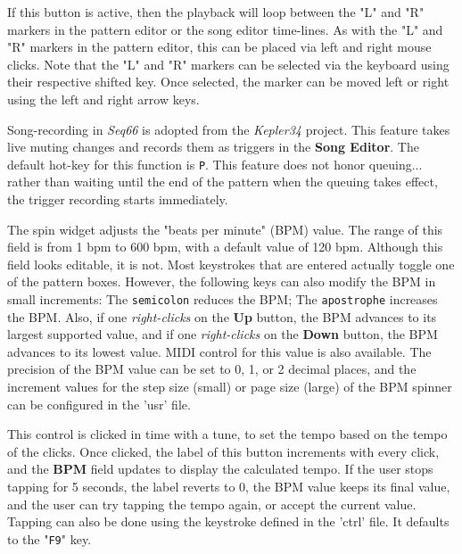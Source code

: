    If this button is active, then the playback will loop
   between the "L" and "R" markers in the pattern editor or the song editor
   time-lines.
   As with the "L" and "R" markers in the pattern editor, this can
   be placed via left and right mouse clicks.
   Note that the "L" and "R" markers can be selected via the keyboard using
   their respective shifted key.  Once selected, the marker can be moved left
   or right using the left and right arrow keys.

   Song-recording in \textsl{Seq66} is adopted from the
   \textsl{Kepler34} project.
   This feature takes live muting changes and records them as
   triggers in the \textbf{Song Editor}.
   The default hot-key for this function is \texttt{P}.
   This feature does not honor queuing...
   rather than waiting until the end of the pattern when the queuing takes
   effect, the trigger recording starts immediately.


   The spin widget adjusts the "beats per minute" (BPM) value.  The
   range of this field is from 1 bpm to 600 bpm, with a default value of
   120 bpm.
   Although this field looks editable, it is not.  Most keystrokes
   that are entered actually toggle one of the pattern boxes.
   However, the following keys can also modify the BPM in small increments:
   The \texttt{semicolon} reduces the BPM;
   The \texttt{apostrophe} increases the BPM.
   Also, if one \textsl{right-clicks} on the
   \textbf{Up} button, the BPM advances to its largest
   supported value, and if one \textsl{right-clicks} on the
   \textbf{Down} button, the BPM
   advances to its lowest value.
   MIDI control for this value is also available.
   The precision of the BPM value can be set to 0, 1, or 2
   decimal places, and the increment values for the step size (small)
   or page size (large) of the BPM spinner can be configured in the 'usr' file.

   This control is clicked in time with a tune, to set the
   tempo based on the tempo of the clicks.  Once clicked, the label of this
   button increments with every click, and the \textbf{BPM} field updates to
   display the calculated tempo.  If the user stops tapping for 5 seconds, the
   label reverts to 0, the BPM value keeps its final value, and the user can
   try tapping the tempo again, or accept the current value.
   Tapping can also be done using the keystroke defined
   in the 'ctrl' file.
   It defaults to the "\texttt{F9}" key.

